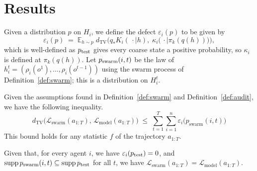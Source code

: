 \section{Results}

\begin{definition}[Defect]
    Given a distribution $p$ on $H_i$, we define the defect $\varepsilon_i(p)$ to be given by
    \begin{equation}
        \varepsilon_i(p) \;=\; \mathbb{E}_{h \sim p}\; d_{\mathrm{TV}}\!\Big( q_{*}K_i(\,\cdot \mid h),\; \kappa_i\big(\,\cdot \mid \pi_k(q(h))\big) \Big),
    \end{equation}
    which is well-defined as $p_{\mathrm{test}}$ gives every coarse state a positive probability, so $\kappa_i$ is defined at $\pi_k(q(h))$.
    Let $p_{\mathrm{swarm}}(i, t)$ be the law of $h^t_i = (\rho_i(o^1), \ldots, \rho_i(o^{t-1}))$ using the swarm process of Definition~\ref{def:swarm}; this is a distribution on $H^t_i$.
\end{definition}

\begin{theorem}[TV Bound]\label{thm:TV_bound}
    Given the assumptions found in Definition~\ref{def:swarm} and Definition~\ref{def:audit}, we have the following inequality.
    \begin{equation}
        d_{\mathrm{TV}}\big(\mathcal{L}_{\text{swarm}}(a_{1:T}),\, \mathcal{L}_{\text{model}}(a_{1:T})\big) \;\le\; \sum_{t=1}^{T} \sum_{i=1}^{n} \varepsilon_i\big(p_{\text{swarm}}(i,t)\big)
    \end{equation}
    This bound holds for any statistic $f$ of the trajectory $a_{1:T}$.
\end{theorem}
    

\begin{proposition}\label{prop:transfer}
    Given that, for every agent $i$, we have $\varepsilon_i(p_{\mathrm{test}}) = 0$, and $\mathop{\mathrm{supp}} p_{\mathrm{swarm}}(i, t) \subseteq \mathop{\mathrm{supp}} p_{\mathrm{test}}$ for all $t$, we have $\mathcal{L}_{\text{swarm}}(a_{1:T}) = \mathcal{L}_{\text{model}}(a_{1:T})$.
\end{proposition}


